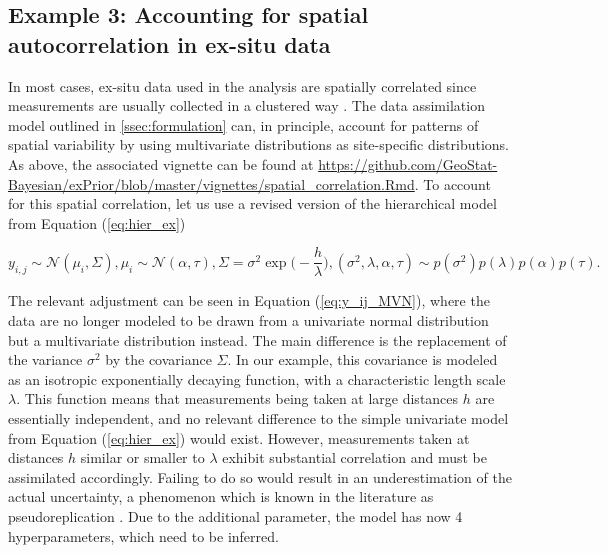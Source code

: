 \subsection{Example 3: Accounting for spatial autocorrelation in ex-situ data} \label{sec:example-spatial}

In most cases, ex-situ data used in the analysis are spatially correlated since measurements are usually collected in a clustered way \citep{Rubin2003, Pyrcz2002}. 
The data assimilation model outlined in \ref{ssec:formulation} can, in principle, account for patterns of spatial variability by using multivariate distributions as site-specific distributions. 
As above, the associated vignette can be found at \url{https://github.com/GeoStat-Bayesian/exPrior/blob/master/vignettes/spatial_correlation.Rmd}.
To account for this spatial correlation, let us use a revised version of the hierarchical model from Equation (\ref{eq:hier_ex})

\begin{subequations}
\label{eq:hier_geospatial}
    \begin{equation}
    \label{eq:y_ij_MVN}
        y_{i,j} \sim \mathcal{N}(\mu_i,\Sigma),
    \end{equation}
    \begin{equation}
    \label{eq:mu_i_N}
        \mu_i \sim \mathcal{N}(\alpha,\tau),
    \end{equation}
    \begin{equation}
    \label{eq:Sigma}
        \Sigma = \sigma^2 \exp\bigg( -\frac{h}{\lambda}\bigg),
    \end{equation}
    \begin{equation}
    \label{eq:variogram_function}
         (\sigma^2, \lambda, \alpha, \tau) \sim p(\sigma^2)p(\lambda)p(\alpha)p(\tau).
    \end{equation}
\end{subequations}

The relevant adjustment can be seen in Equation (\ref{eq:y_ij_MVN}), where the data are no longer modeled to be drawn from a univariate normal distribution but a multivariate distribution instead. 
The main difference is the replacement of the variance $\sigma^2$ by the covariance $\Sigma$. 
In our example, this covariance is modeled as an isotropic exponentially decaying function, with a characteristic length scale $\lambda$. 
This function means that measurements being taken at large distances $h$ are essentially independent, and no relevant difference to the simple univariate model from Equation (\ref{eq:hier_ex}) would exist. 
However, measurements taken at distances $h$ similar or smaller to $\lambda$ exhibit substantial correlation and must be assimilated accordingly. 
Failing to do so would result in an underestimation of the actual uncertainty, a phenomenon which is known in the literature as pseudoreplication \citep{Hurlbert1984, Legendre1993}. 
Due to the additional parameter, the model has now 4 hyperparameters, which need to be inferred.

